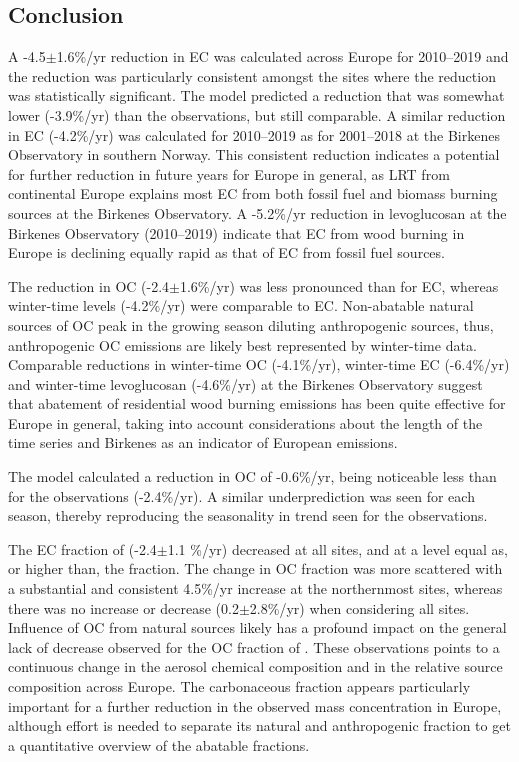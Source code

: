 \subsection{Conclusion}
\label{ss:trendsECOCconc}

A -4.5$\pm$1.6\%/yr reduction in EC was calculated across Europe for
2010--2019 and the reduction was particularly consistent amongst the
sites where the reduction was statistically significant. The model
predicted a reduction that was somewhat lower (-3.9\%/yr) than the
observations, but still comparable. A similar reduction in EC (-4.2\%/yr)
was calculated for 2010--2019 as for 2001--2018 at the Birkenes
Observatory in southern Norway. This consistent reduction indicates a
potential for further reduction in future years for Europe in general,
as LRT from continental Europe explains most EC from both fossil fuel
and biomass burning sources at the Birkenes Observatory. A  -5.2\%/yr
reduction in levoglucosan at the Birkenes Observatory (2010--2019)
 indicate that EC from wood burning in Europe is declining equally
rapid as that of EC from fossil fuel sources.

The reduction in OC (-2.4$\pm$1.6\%/yr) was less pronounced than for EC,
whereas winter-time levels (-4.2\%/yr) were comparable to EC. Non-abatable
natural sources of OC peak in the growing season diluting anthropogenic
sources, thus, anthropogenic OC emissions are likely best represented by
winter-time data. Comparable reductions in winter-time OC (-4.1\%/yr),
winter-time EC (-6.4\%/yr) and winter-time levoglucosan (-4.6\%/yr)
at the Birkenes Observatory suggest that abatement of residential
wood burning emissions has been quite effective for Europe in general,
taking into account considerations about the length of the time series
and Birkenes as an indicator of European emissions.

The model calculated a reduction in OC of -0.6\%/yr, being noticeable
less than for the observations (-2.4\%/yr). A similar underprediction
was seen for each season, thereby reproducing the seasonality in trend
seen for the observations.

The EC fraction of \pmfine (-2.4$\pm$1.1 \%/yr) decreased at all
sites, and at a level equal as, or higher than, the  fraction. The
change in OC fraction was more scattered with a substantial and
consistent 4.5\%/yr increase at the northernmost sites, whereas
there was no increase or decrease (0.2$\pm$2.8\%/yr) when considering
all sites. Influence of OC from natural sources likely has a profound
impact on the general lack of decrease observed for the OC fraction of
\pmfine. These observations points to a continuous change in the aerosol
chemical composition and in the relative source composition across
Europe. The carbonaceous fraction appears particularly important for a
further reduction in the observed \pmfine mass concentration in Europe,
although effort is needed to separate its natural and anthropogenic
fraction to get a quantitative overview of the abatable fractions.


\clearpage
\renewcommand\bibname{References}      %

